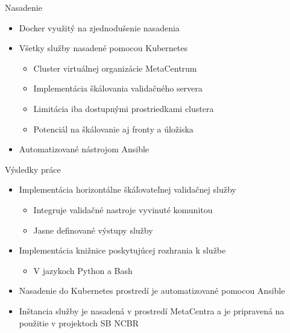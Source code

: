 \documentclass[
  aspectratio=169,
]{beamer}
\begin{document}
\begin{frame}{Nasadenie}
	\begin{itemize}
		\item Docker využitý na zjednodušenie nasadenia

		\item Všetky služby nasadené pomocou Kubernetes
		      \begin{itemize}
			      \item Cluster virtuálnej organizácie MetaCentrum
			      \item Implementácia škálovania validačného servera
			      \item Limitácia iba dostupnými prostriedkami clustera
			      \item Potenciál na škálovanie aj fronty a úložiska
		      \end{itemize}
		\item Automatizované nástrojom Ansible
	\end{itemize}
\end{frame}

\begin{frame}{Výsledky práce}
	\begin{itemize}
		\item Implementácia horizontálne škáľovateľnej validačnej služby
		      \begin{itemize}
			      \item Integruje validačné nastroje vyvinuté komunitou
			      \item Jasne definované výstupy služby
		      \end{itemize}

		\item Implementácia knižnice poskytujúcej rozhrania k službe
		      \begin{itemize}
			      \item V jazykoch Python a Bash
		      \end{itemize}

		\item Nasadenie do Kubernetes prostredí je automatizované pomocou Ansible
		\item Inštancia služby je nasadená v prostredí MetaCentra a je pripravená na použitie v projektoch SB NCBR
	\end{itemize}
\end{frame}

\makeoutro
\end{document}

